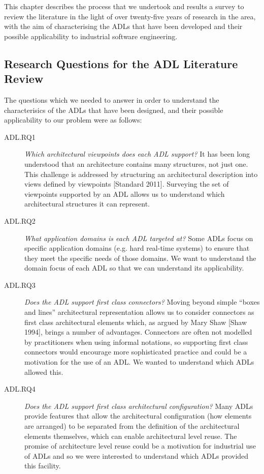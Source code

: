 This chapter describes the process that we undertook and results a survey to review the literature in the light of over twenty-five years of research in the area, with the aim of characterising the ADLs that have been developed and their possible applicability to industrial software engineering.

\subsection{Research Questions for the ADL Literature Review}

The questions which we needed to answer in order to understand the characterisics of the ADLs that have been designed, and their possible applicability to our problem were as follows:

\begin{description}
\item[ADL.RQ1] \emph{Which architectural viewpoints does each ADL support?}  It has been long understood that an architecture contains many structures, not just one.  This challenge is addressed by structuring an architectural description into views defined by viewpoints [Standard 2011]. Surveying the set of viewpoints supported by an ADL allows us to understand which architectural structures it can represent.

\item[ADL.RQ2] \emph{What application domains is each ADL targeted at?}  Some ADLs focus on specific application domains (e.g. hard real-time systems) to ensure that they meet the specific needs of those domains.  We want to understand the domain focus of each ADL so that we can understand its applicability.

\item [ADL.RQ3] \emph{Does the ADL support first class connectors?}  Moving beyond simple “boxes and lines” architectural representation allows us to consider connectors as first class architectural elements which, as argued by Mary Shaw [Shaw 1994], brings a number of advantages.  Connectors are often not modelled by practitioners when using informal notations, so supporting first class connectors would encourage more sophisticated practice and could be a motivation for the use of an ADL. We wanted to understand which ADLs allowed this.

\item[ADL.RQ4] \emph{Does the ADL support first class architectural configuration?}  Many ADLs provide features that allow the architectural configuration (how elements are arranged) to be separated from the definition of the architectural elements themselves, which can enable architectural level reuse.  The promise of architecture level reuse could be a motivation for industrial use of ADLs and so we were interested to understand which ADLs provided this facility.


\end{description}
